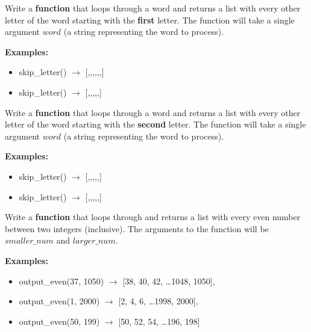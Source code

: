 



	\item 
		Write a \textbf{function} that loops through a word and returns a list with every 
		other letter of the word starting with the \textbf{first} letter.
		The function will take a single argument $word$ (a string representing the word to process).

		\textbf{Examples:}		
		\begin{itemize}
			\item  skip\_letter() $\rightarrow$ 
				[,,\csq{t},,,,]
			\item  skip\_letter() $\rightarrow$
				[,\csq{n},,,,\csq{a}]
		\end{itemize}

	\item 
		Write a \textbf{function} that loops through a word and returns a list with every 
		other letter of the word starting with the \textbf{second} letter.
		The function will take a single argument $word$ (a string representing the word to process).

		\textbf{Examples:}		
		\begin{itemize}
			\item  skip\_letter() $\rightarrow$ 
				[,,,,,]
			\item  skip\_letter() $\rightarrow$
				[\csq{a},,,,,]
		\end{itemize}


	\item 
		Write a \textbf{function} that loops through and returns a list with every even number between two
		integers (inclusive). The arguments to the function will be $smaller\_num$ and 
		$larger\_num$.

		\textbf{Examples:}		
		\begin{itemize}
			\item  output\_even(37, 1050) $\rightarrow$ [38, 40, 42, \dots 1048, 1050], 
			\item  output\_even(1, 2000) $\rightarrow$ [2, 4, 6, \dots 1998, 2000], 
			\item  output\_even(50, 199) $\rightarrow$ [50, 52, 54, \dots 196, 198]
		\end{itemize}

